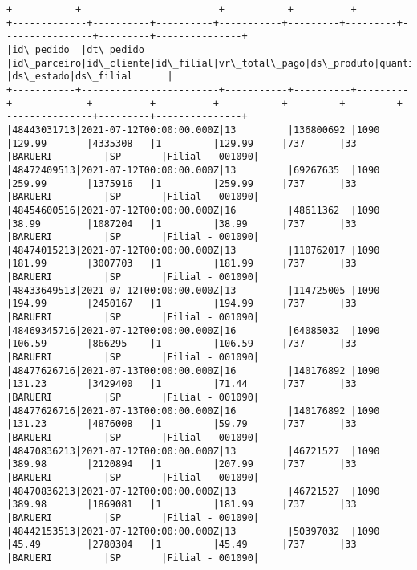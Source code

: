\documentclass[11pt]{article}
\begin{document}
    \begin{Verbatim}[commandchars=\\\{\}]
+-----------+------------------------+-----------+----------+---------+-------------+----------+----------+-----------+---------+---------+----------------+---------+---------------+
|id\_pedido  |dt\_pedido               |id\_parceiro|id\_cliente|id\_filial|vr\_total\_pago|ds\_produto|quantidade|vr\_unitario|id\_cidade|id\_estado|ds\_cidade       |ds\_estado|ds\_filial      |
+-----------+------------------------+-----------+----------+---------+-------------+----------+----------+-----------+---------+---------+----------------+---------+---------------+
|48443031713|2021-07-12T00:00:00.000Z|13         |136800692 |1090     |129.99       |4335308   |1         |129.99     |737      |33       |BARUERI         |SP       |Filial - 001090|
|48472409513|2021-07-12T00:00:00.000Z|13         |69267635  |1090     |259.99       |1375916   |1         |259.99     |737      |33       |BARUERI         |SP       |Filial - 001090|
|48454600516|2021-07-12T00:00:00.000Z|16         |48611362  |1090     |38.99        |1087204   |1         |38.99      |737      |33       |BARUERI         |SP       |Filial - 001090|
|48474015213|2021-07-12T00:00:00.000Z|13         |110762017 |1090     |181.99       |3007703   |1         |181.99     |737      |33       |BARUERI         |SP       |Filial - 001090|
|48433649513|2021-07-12T00:00:00.000Z|13         |114725005 |1090     |194.99       |2450167   |1         |194.99     |737      |33       |BARUERI         |SP       |Filial - 001090|
|48469345716|2021-07-12T00:00:00.000Z|16         |64085032  |1090     |106.59       |866295    |1         |106.59     |737      |33       |BARUERI         |SP       |Filial - 001090|
|48477626716|2021-07-13T00:00:00.000Z|16         |140176892 |1090     |131.23       |3429400   |1         |71.44      |737      |33       |BARUERI         |SP       |Filial - 001090|
|48477626716|2021-07-13T00:00:00.000Z|16         |140176892 |1090     |131.23       |4876008   |1         |59.79      |737      |33       |BARUERI         |SP       |Filial - 001090|
|48470836213|2021-07-12T00:00:00.000Z|13         |46721527  |1090     |389.98       |2120894   |1         |207.99     |737      |33       |BARUERI         |SP       |Filial - 001090|
|48470836213|2021-07-12T00:00:00.000Z|13         |46721527  |1090     |389.98       |1869081   |1         |181.99     |737      |33       |BARUERI         |SP       |Filial - 001090|
|48442153513|2021-07-12T00:00:00.000Z|13         |50397032  |1090     |45.49        |2780304   |1         |45.49      |737      |33       |BARUERI         |SP       |Filial - 001090|

\end{Verbatim}
\end{document}
